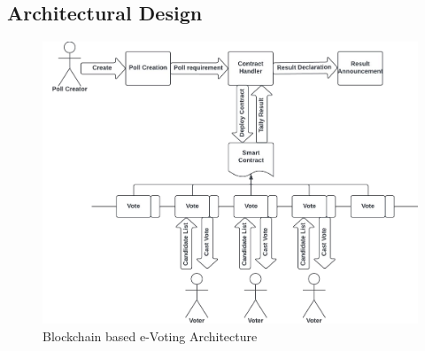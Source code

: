\documentclass[oneside, 12pt]{book}
\begin{document}
\subsection{Architectural Design}
\begin{figure}[H]
	\includegraphics[width=\linewidth]{./Resources/architecture.png}
	\caption{Blockchain based e-Voting Architecture}
	\label{fig:annexure-architecture}
\end{figure}
\newpage
\end{document}
